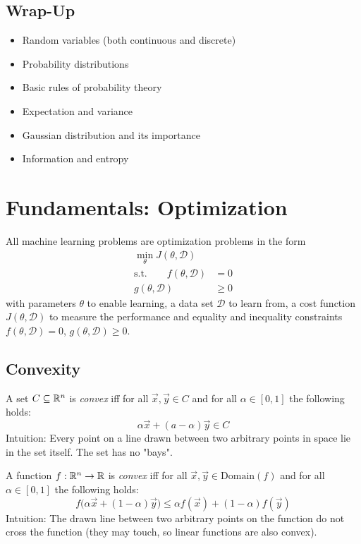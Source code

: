 	\section{Wrap-Up}
		\begin{itemize}
			\item Random variables (both continuous and discrete)
			\item Probability distributions
			\item Basic rules of probability theory
			\item Expectation and variance
			\item Gaussian distribution and its importance
			\item Information and entropy
		\end{itemize}

\chapter{Fundamentals: Optimization}

	All machine learning problems are optimization problems in the form
	\begin{align}
		\min_\theta J(\theta, \mathcal{D}) &        \\
		\textrm{s.t.} \qquad
		f(\theta, \mathcal{D})             & = 0    \\
		g(\theta, \mathcal{D})             & \geq 0
	\end{align}
	with parameters \(\theta\) to enable learning, a data set \(\mathcal{D}\) to learn from, a cost function \(J(\theta, \mathcal{D})\) to measure the performance and equality and inequality constraints \( f(\theta, \mathcal{D}) = 0 \), \( g(\theta, \mathcal{D}) \geq 0 \).

	\section{Convexity}
		A set \( C \subseteq \mathbb{R}^n \) is \emph{convex} iff for all \( \vec{x}, \vec{y} \in C \) and for all \( \alpha \in [0, 1] \) the following holds:
		\begin{equation}
			\alpha\vec{x} + (a - \alpha)\vec{y} \in C
		\end{equation}
		Intuition: Every point on a line drawn between two arbitrary points in space lie in the set itself. The set has no "bays".

		A function \( f : \mathbb{R}^n \to \mathbb{R} \) is \emph{convex} iff for all \( \vec{x}, \vec{y} \in \textrm{Domain}(f) \) and for all \( \alpha \in [0, 1] \) the following holds:
		\begin{equation}
			f\big( \alpha\vec{x} + (1 - \alpha)\vec{y} \big) \leq \alpha f(\vec{x}) + (1 - \alpha)f(\vec{y})
		\end{equation}
		Intuition: The drawn line between two arbitrary points on the function do not cross the function (they may touch, so linear functions are also convex).

